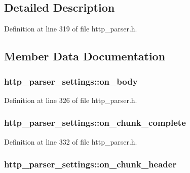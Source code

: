 \subsection{Detailed Description}


Definition at line 319 of file http\-\_\-parser.\-h.



\subsection{Member Data Documentation}
\hypertarget{structhttp__parser__settings_aaa145d7c24c91f471b2079ecb6368ae4}{
\subsubsection[{on\-\_\-body}]{ http\-\_\-parser\-\_\-settings\-::on\-\_\-body}}\label{structhttp__parser__settings_aaa145d7c24c91f471b2079ecb6368ae4}


Definition at line 326 of file http\-\_\-parser.\-h.

\hypertarget{structhttp__parser__settings_ac1c8453573094795ef41d4ba26e78846}{
\subsubsection[{on\-\_\-chunk\-\_\-complete}]{ http\-\_\-parser\-\_\-settings\-::on\-\_\-chunk\-\_\-complete}}\label{structhttp__parser__settings_ac1c8453573094795ef41d4ba26e78846}


Definition at line 332 of file http\-\_\-parser.\-h.

\hypertarget{structhttp__parser__settings_a497cf8f9d68e06e54684b71ee0f9f828}{
\subsubsection[{on\-\_\-chunk\-\_\-header}]{ http\-\_\-parser\-\_\-settings\-::on\-\_\-chunk\-\_\-header}}\label{structhttp__parser__settings_a497cf8f9d68e06e54684b71ee0f9f828}


